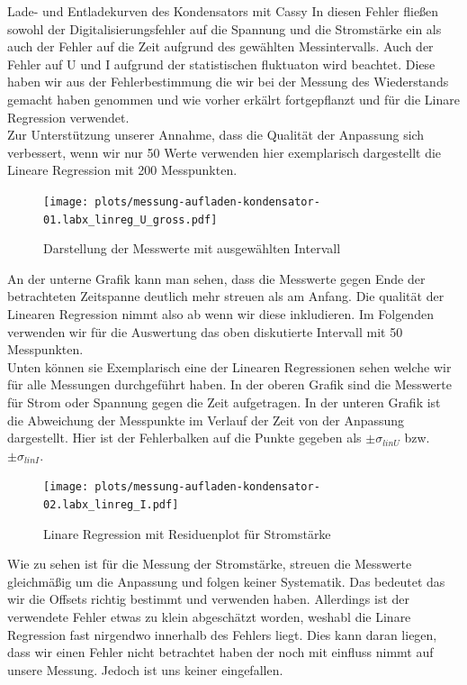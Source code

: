 \documentclass[twoside]{protokoll}
\begin{document}
\begin{aufgabe}{Lade- und Entladekurven des Kondensators mit Cassy}
In diesen Fehler fließen sowohl der Digitalisierungsfehler auf die Spannung und die Stromstärke ein als auch der Fehler auf die Zeit aufgrund des gewählten Messintervalls.
Auch der Fehler auf U und I aufgrund der statistischen fluktuaton wird beachtet. 
Diese haben wir aus der Fehlerbestimmung die wir bei der Messung des Wiederstands gemacht haben genommen und wie vorher erkälrt fortgepflanzt und für die Linare Regression verwendet.\\

Zur Unterstützung unserer Annahme, dass die Qualität der Anpassung sich verbessert, wenn wir nur 50 Werte verwenden hier exemplarisch dargestellt die Lineare Regression mit 200 Messpunkten.\\

\begin{figure}[H]
    \centering
    \texttt{[image: plots/messung-aufladen-kondensator-01.labx\_linreg\_U\_gross.pdf]}
    \caption{Darstellung der Messwerte mit ausgewählten Intervall}
    \centering
\end{figure}

An der unterne Grafik kann man sehen, dass die Messwerte gegen Ende der betrachteten Zeitspanne deutlich mehr streuen als am Anfang. 
Die qualität der Linearen Regression nimmt also ab wenn wir diese inkludieren.
Im Folgenden verwenden wir für die Auswertung das oben diskutierte Intervall mit 50 Messpunkten.  \\ 

 

Unten können sie Exemplarisch eine der Linearen Regressionen sehen welche wir für alle Messungen durchgeführt haben.
In der oberen Grafik sind die Messwerte für Strom oder Spannung gegen die Zeit aufgetragen.
In der unteren Grafik ist die Abweichung der Messpunkte im Verlauf der Zeit von der Anpassung dargestellt. 
Hier ist der Fehlerbalken auf die Punkte gegeben als $\pm \sigma_{linU}$ bzw. $\pm \sigma_{linI}$.

\begin{figure}[H]
    \centering
    \texttt{[image: plots/messung-aufladen-kondensator-02.labx\_linreg\_I.pdf]}
    \hfill
    \caption{Linare Regression mit Residuenplot für Stromstärke}
    \centering
\end{figure}

Wie zu sehen ist für die Messung der Stromstärke, streuen die Messwerte gleichmäßig um die Anpassung und folgen keiner Systematik.
Das bedeutet das wir die Offsets richtig bestimmt und verwenden haben.
Allerdings ist der verwendete Fehler etwas zu klein abgeschätzt worden, weshabl die Linare Regression fast nirgendwo innerhalb des Fehlers liegt.
Dies kann daran liegen, dass wir einen Fehler nicht betrachtet haben der noch mit einfluss nimmt auf unsere Messung. Jedoch ist uns keiner eingefallen. 


\end{aufgabe}
\end{document}
